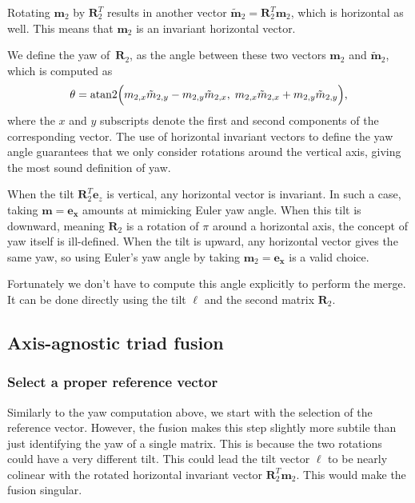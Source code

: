 \documentclass{IJCAS}
\begin{document}
Rotating $\boldsymbol{m}_2$ by $\boldsymbol{R}_{2}^T$
results in another vector
$\tilde{\boldsymbol{m}}_2=\boldsymbol{R}_{2}^T\boldsymbol{m}_2$, which is horizontal as well.
This means that  $\boldsymbol{m}_2$ is an invariant horizontal vector. 

We define the yaw of~$\boldsymbol{R}_{2}$, as the angle between these two vectors $\boldsymbol{m}_2$ and $\tilde{\boldsymbol{m}}_2$, which is computed as
\begin{equation}
  \theta
  =
  \operatorname{atan2}\Bigl(
     {m}_{2,x}\tilde{{m}}_{2,y}
    -{m}_{2,y}\tilde{{m}}_{2,x},\;
     {m}_{2,x}\tilde{{m}}_{2,x}
    +{m}_{2,y}\tilde{{m}}_{2,y}
  \Bigr),
  \label{eq:yaw_theta}
\end{equation}
where the $x$ and $y$ subscripts denote the first and second components of the corresponding vector. 
The use of horizontal invariant vectors to define the yaw angle guarantees that we only consider rotations around the vertical axis, giving the most sound definition of yaw.

When the tilt $\boldsymbol{R}_{2}^T \boldsymbol{e}_z$ is vertical, any horizontal vector is invariant. In such a case, taking $\boldsymbol{m}=\boldsymbol{e_x}$ amounts at mimicking Euler yaw angle. 
When this tilt is downward, meaning $\boldsymbol{R}_{2}$ is a rotation of $\pi$ around a horizontal axis, the concept of yaw itself is ill-defined. When the tilt is upward, any horizontal vector gives the same yaw, so using Euler's yaw angle by taking  $\boldsymbol{m}_2=\boldsymbol{e_x}$ is a valid choice.

 Fortunately we don't have to compute this angle explicitly to perform the merge. It can be done directly using the tilt $\boldsymbol{\ell}$ and the second matrix $\boldsymbol{R}_{2}$.

\subsection{Axis-agnostic triad fusion}
\label{sec:triad_fusion}

\subsubsection{Select a proper reference vector}
Similarly to the yaw computation above, we start with the selection of the reference vector. However, the fusion makes this step slightly more subtile than just identifying the yaw of a single matrix. This is because the two rotations could have a very different tilt. This could lead the tilt vector $\boldsymbol{\ell}$ to be nearly colinear with the rotated horizontal invariant vector $\boldsymbol{R}_{2}^T\boldsymbol{m}_2$. This would make the fusion singular. 
\end{document}
